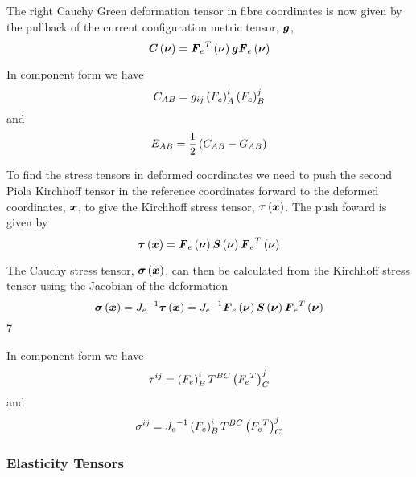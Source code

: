 The right Cauchy Green deformation tensor in fibre coordinates is now given by
the pullback of the current configuration metric tensor, $\boldsymbol{\mathit{g}}$,
\begin{equation}
   \boldsymbol{\mathit{C}}\left( \boldsymbol{\nu} \right) = {\boldsymbol{\mathit{F}}_{e}}^{T}\left( \boldsymbol{\nu} \right) \boldsymbol{\mathit{g}} \boldsymbol{\mathit{F}}_{e}\left( \boldsymbol{\nu} \right) 
\end{equation}

In component form we have
\begin{equation}
  C_{AB}=g_{ij}\left( F_{e} \right)^{i}_{A}\left( F_{e} \right)^{j}_{B}
\end{equation}
and
\begin{equation}
  E_{AB}=\frac{1}{2}\left( C_{AB}-G_{AB} \right)
\end{equation}

To find the stress tensors in deformed coordinates we need to push the second
Piola Kirchhoff tensor in the reference coordinates forward to the deformed
coordinates, $\boldsymbol{x}$, to give the Kirchhoff stress tensor,
$ \boldsymbol{\mathit{\tau}}\left( \boldsymbol{x} \right) $. The push foward is given by
\begin{equation}
   \boldsymbol{\mathit{\tau}}\left( \boldsymbol{x} \right) = \boldsymbol{\mathit{F}}_{e}\left( \boldsymbol{\nu} \right)  \boldsymbol{\mathit{S}}\left( \boldsymbol{\nu} \right) 
   {\boldsymbol{\mathit{F}}_{e}}^{T}\left( \boldsymbol{\nu} \right) 
\end{equation}

The Cauchy stress tensor, $ \boldsymbol{\mathit{\sigma}}\left( \boldsymbol{x} \right) $, can then be calculated from the Kirchhoff stress
tensor using the Jacobian of the deformation \ie
\begin{equation}
   \boldsymbol{\mathit{\sigma}}\left( \boldsymbol{x} \right) ={J_{e}}^{-1} \boldsymbol{\mathit{\tau}}\left( \boldsymbol{x} \right) ={J_{e}}^{-1}
   \boldsymbol{\mathit{F}}_{e}\left( \boldsymbol{\nu} \right)  \boldsymbol{\mathit{S}}\left( \boldsymbol{\nu} \right)  {\boldsymbol{\mathit{F}}_{e}}^{T}\left( \boldsymbol{\nu} \right) 
\end{equation}7

In component form we have
\begin{equation}
  \tau^{ij}=\left( F_{e} \right)^{i}_{B}T^{BC}\left( {F_{e}}^{T} \right)^{j}_{C}
\end{equation}
and
\begin{equation}
  \sigma^{ij}={J_{e}}^{-1}\left( F_{e} \right)^{i}_{B}T^{BC}\left( {F_{e}}^{T} \right)^{j}_{C}
\end{equation}


\subsubsection{Elasticity Tensors}

